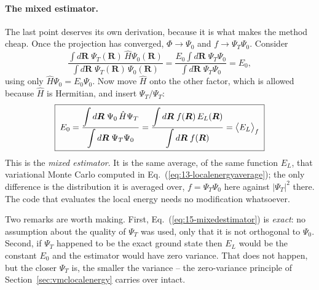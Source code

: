 \paragraph{The mixed estimator.}
The last point deserves its own derivation, because it is what makes the
method cheap.  Once the projection has converged, $\Phi\to\Psi_0$ and
$f\to\Psi_T\Psi_0$.  Consider
\begin{equation}
  \frac{\displaystyle\int d\bm{R}\;\Psi_T(\bm{R})\,\hat{H}\Psi_0(\bm{R})}
       {\displaystyle\int d\bm{R}\;\Psi_T(\bm{R})\,\Psi_0(\bm{R})}
   = \frac{E_0\displaystyle\int d\bm{R}\;\Psi_T\Psi_0}
          {\displaystyle\int d\bm{R}\;\Psi_T\Psi_0}
   = E_0 ,
  \label{eq:15-mixednumerator}
\end{equation}
using only $\hat{H}\Psi_0=E_0\Psi_0$.  Now move $\hat{H}$ onto the other
factor, which is allowed because $\hat{H}$ is Hermitian, and insert
$\Psi_T/\Psi_T$:
\begin{equation}
  \boxed{\;
  E_0
   = \frac{\displaystyle\int d\bm{R}\;\Psi_0\,\hat{H}\Psi_T}
          {\displaystyle\int d\bm{R}\;\Psi_T\Psi_0}
   = \frac{\displaystyle\int d\bm{R}\;f(\bm{R})\,E_L(\bm{R})}
          {\displaystyle\int d\bm{R}\;f(\bm{R})}
   = \big\langle E_L \big\rangle_f \;}
  \label{eq:15-mixedestimator}
\end{equation}
This is the \emph{mixed estimator}.  It is the same average, of the same
function $E_L$, that variational Monte Carlo computed in
Eq.~(\ref{eq:13-localenergyaverage}); the only difference is the distribution
it is averaged over, $f=\Psi_T\Psi_0$ here against $|\Psi_T|^2$ there.  The
code that evaluates the local energy needs no modification whatsoever.

Two remarks are worth making.  First,
Eq.~(\ref{eq:15-mixedestimator}) is \emph{exact}: no assumption about the
quality of $\Psi_T$ was used, only that it is not orthogonal to $\Psi_0$.
Second, if $\Psi_T$ happened to be the exact ground state then $E_L$ would be
the constant $E_0$ and the estimator would have zero variance.  That does not
happen, but the closer $\Psi_T$ is, the smaller the variance -- the
zero-variance principle of Section~\ref{sec:vmclocalenergy} carries over
intact.

